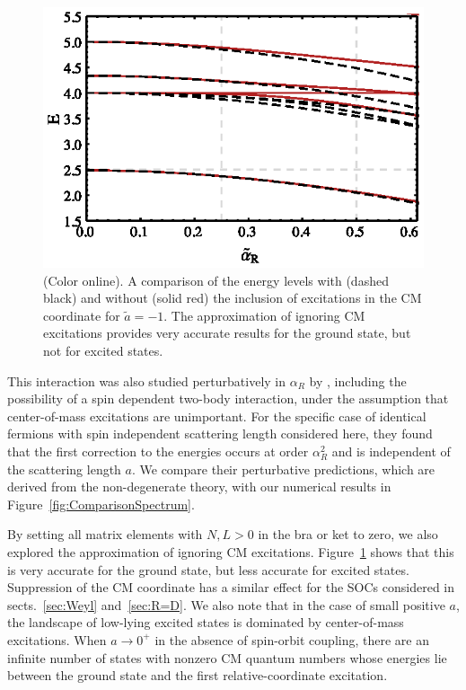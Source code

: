 \documentclass[%
 notitlepage,
 preprint,
showpacs,%
 amsmath,amssymb,
 aps,
pra,
]{revtex4-1}
\begin{document}
\begin{figure}
\includegraphics{Figures/ComparisonNoCM}
\caption{\label{fig:ComparisonSpectrum2}(Color online).  A comparison of the energy levels with (dashed black) and without (solid red) the inclusion of excitations in the CM coordinate for $\tilde{a}=-1$. The approximation of ignoring CM excitations provides very accurate results for the ground state, but not for excited states.} 
\end{figure}


This interaction was also studied perturbatively in $\alpha_R$ by \cite{PhysRevA.89.033606}, including the possibility of a spin dependent two-body interaction, under the assumption that center-of-mass excitations are unimportant. For the specific case of identical fermions with spin independent scattering length considered here, they found that the first correction to the energies occurs at order $\alpha_R^2$ and is independent of the scattering length $a$. We compare their perturbative predictions, which are derived from the non-degenerate theory, with our numerical results in Figure~\ref{fig:ComparisonSpectrum}. 

By setting all matrix elements with $N,L>0$ in the bra or ket to zero, we also explored the approximation of ignoring CM excitations. Figure~\ref{fig:ComparisonSpectrum2} shows that this is very accurate for the ground state, but less accurate for excited states. Suppression of the CM coordinate has a similar effect for the SOCs considered in sects.~\ref{sec:Weyl} and~\ref{sec:R=D}. We also note that in the case of small positive $a$, the landscape of low-lying excited states is dominated by center-of-mass excitations. When $a\rightarrow0^+$ in the absence of spin-orbit coupling, there are an infinite number of states with nonzero CM quantum numbers whose energies lie between the ground state and the first relative-coordinate excitation.
\end{document}
